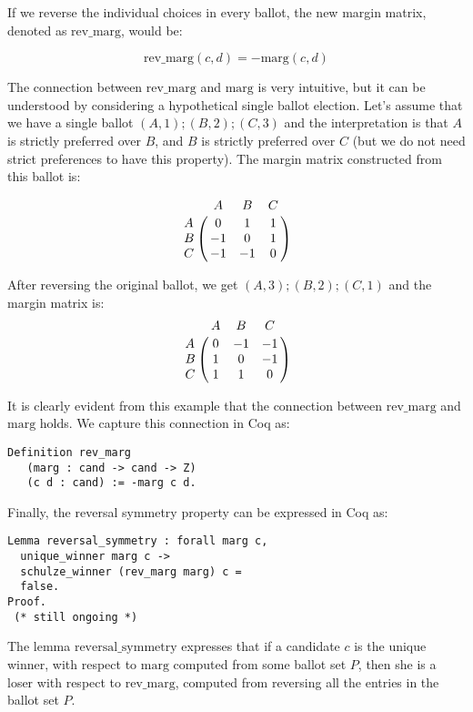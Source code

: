 \documentclass[compsoc,conference,a4paper,10pt,times]{IEEEtran}
\begin{document}
\noindent
If we reverse the individual choices in every ballot, the new margin matrix, denoted as $\mathrm{rev\_marg}$, would be:

\[
  \mathrm{rev\_marg}(c, d) = -  \mathrm{marg} (c, d)  
\]      

\noindent
The connection between $\mathrm{rev\_marg}$ and $\mathrm{marg}$ is very intuitive, but it can be understood 
by considering a hypothetical single ballot election. Let's assume that we have 
a single ballot $(A, 1); (B, 2); (C, 3)$ and the interpretation is 
that $A$ is strictly preferred over $B$, and $B$ is strictly preferred over $C$ 
(but we do not need strict preferences to have this property).  The margin matrix
constructed from this ballot is: 

\[
\bordermatrix{ & A & B & C \cr
      A & 0 & 1 & 1 \cr
      B & -1 & 0 & 1 \cr
      C & -1 & -1 & 0 }
      \]
    
\noindent      
After reversing the original ballot, we get $(A, 3); (B, 2); (C, 1)$ and 
the margin matrix is:
\[
\bordermatrix{ & A & B & C \cr
      A & 0 & -1 & -1 \cr
      B & 1 & 0 & -1 \cr
      C & 1 & 1 & 0 }
      \]


\noindent
It is clearly evident from this example that the 
connection between $\mathrm{rev\_marg}$ and $\mathrm{marg}$  holds.
We capture this connection in Coq as:

\begin{verbatim}
Definition rev_marg 
   (marg : cand -> cand -> Z) 
   (c d : cand) := -marg c d.
\end{verbatim}

\noindent


Finally, the reversal symmetry property can be expressed in Coq as: 
\begin{verbatim}
Lemma reversal_symmetry : forall marg c, 
  unique_winner marg c ->
  schulze_winner (rev_marg marg) c = 
  false.
Proof. 
 (* still ongoing *)
\end{verbatim}

\noindent
The lemma $\mathrm{reversal\_symmetry}$ expresses that if a candidate $c$ is the unique 
winner, with respect to $\mathrm{marg}$ computed from some ballot set $P$, then she is 
a loser with respect to $\mathrm{rev\_marg}$, computed from reversing all the entries 
in the ballot set $P$.
\end{document}
